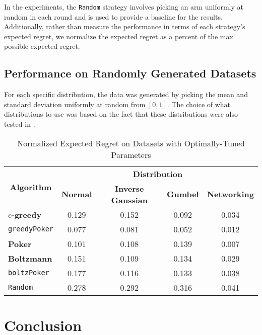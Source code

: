 \documentclass[12pt]{article}
\begin{document}
In the experiments, the \texttt{Random} strategy involves picking an arm uniformly at random in each round and is used to provide a baseline for the results.  Additionally,
rather than measure the performance in terms of each strategy's expected regret, we normalize the expected regret as a percent of the max possible expected regret. 

\subsection{Performance on Randomly Generated Datasets}
For each specific distribution, the data was generated by picking the mean and standard deviation uniformly at random from $[0,1]$.  The choice of what
distributions to use was based on the fact that these distributions were also tested in \cite{Kuleshov}. 

\begin{table}[htbp]
  \centering
  \caption{Normalized Expected Regret on Datasets with Optimally-Tuned Parameters}
    \begin{tabular}{|c|c|c|c|c|}
    \hline
    \multicolumn{1}{|c|}{\multirow{2}[5]{*}{\textbf{Algorithm}}} & \multicolumn{4}{|c|}{\textbf{Distribution}} \\ \cline{2-5}
    \multicolumn{1}{|c|}{} & \multicolumn{1}{|c|}{\textbf{Normal}} & \multicolumn{1}{|c|}{\textbf{Inverse Gaussian}} & \multicolumn{1}{|c|}{\textbf{Gumbel}} & \multicolumn{1}{|c|}{\textbf{Networking}} \\ \hline
    \multicolumn{1}{|l|}{\textbf{$\epsilon$-greedy}} & 0.129 & 0.152 & 0.092 & 0.034 \\  \hline
    \multicolumn{1}{|l|}{\texttt{greedyPoker}} & 0.077 & 0.081 & 0.052 & 0.012   \\ \hline
    \multicolumn{1}{|l|}{\textbf{Poker}} & 0.101 & 0.108 & 0.139  & 0.007\\ \hline
    \multicolumn{1}{|l|}{\textbf{Boltzmann}} & 0.151 & 0.109 & 0.134 & 0.029  \\ \hline
    \multicolumn{1}{|l|}{\texttt{boltzPoker}} & 0.177 & 0.116 & 0.133  & 0.038 \\ \hline
    \multicolumn{1}{|l|}{\texttt{Random}} & 0.278 & 0.292 & 0.316 & 0.041  \\ \hline
    \end{tabular}%
  \label{tab:tuned_results}%
\end{table}%


\section{Conclusion}
\end{document}
